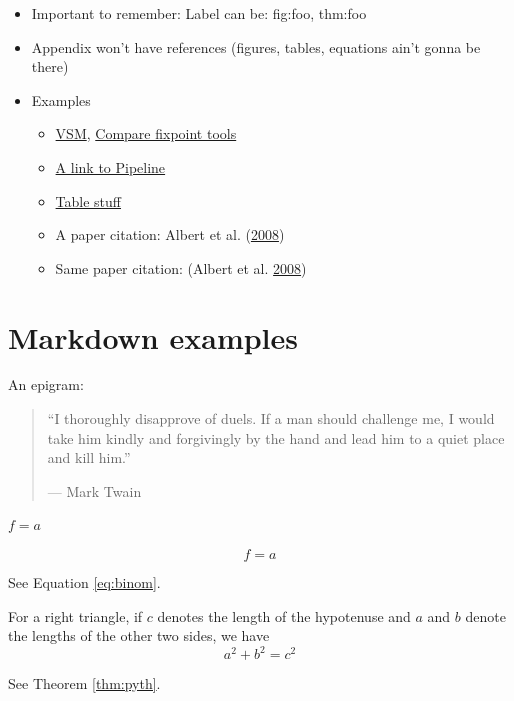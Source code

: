 \documentclass[12pt,]{book}
\providecommand{\tightlist}{%
  \setlength{\itemsep}{0pt}\setlength{\parskip}{0pt}}
\theoremstyle{definition}
\theoremstyle{definition}
\theoremstyle{definition}
\theoremstyle{remark}
\let\BeginKnitrBlock\begin \let\EndKnitrBlock\end
\begin{document}
\begin{itemize}
\tightlist
\item
  Important to remember: Label can be: fig:foo, thm:foo
\item
  Appendix won't have references (figures, tables, equations ain't gonna be
  there)
\item
  Examples

  \begin{itemize}
  \tightlist
  \item
    \protect\hyperlink{vsm-1}{VSM}, \protect\hyperlink{compare-fixpoint-tools}{Compare fixpoint tools}
  \item
    \protect\hyperlink{pipeline-1}{A link to Pipeline}
  \item
    \protect\hyperlink{tables}{Table stuff}
  \item
    A paper citation: Albert et al. (\protect\hyperlink{ref-Albert2008}{2008})
  \item
    Same paper citation: (Albert et al. \protect\hyperlink{ref-Albert2008}{2008})
  \end{itemize}
\end{itemize}

\hypertarget{markdown-examples}{%
\section{Markdown examples}\label{markdown-examples}}

An epigram:

\begin{quote}
``I thoroughly disapprove of duels. If a man should challenge me,
I would take him kindly and forgivingly by the hand and lead him
to a quiet place and kill him.''

--- Mark Twain
\end{quote}

\(f = a\)

\begin{equation} 
  f=a
  \label{eq:binom}
\end{equation}

See Equation \eqref{eq:binom}.

\BeginKnitrBlock{theorem}[Pythagorean theorem]
\protect\hypertarget{thm:pyth}{}{\label{thm:pyth} {} }For a right triangle, if \(c\) denotes the length of the hypotenuse
and \(a\) and \(b\) denote the lengths of the other two sides, we have
\[a^2 + b^2 = c^2\]
\EndKnitrBlock{theorem}

See Theorem \ref{thm:pyth}.
\end{document}
